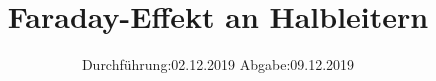 


\subject{V46}
\title{Faraday-Effekt an Halbleitern}
\date{%
  Durchführung:02.12.2019
  \hspace{3em}
  Abgabe:09.12.2019
}



\maketitle
\thispagestyle{empty}
\tableofcontents
\newpage






\printbibliography{}


